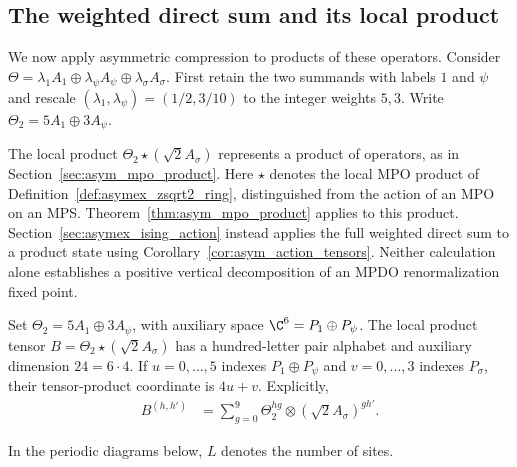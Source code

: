 \subsection{The weighted direct sum and its local product}%
\label{sec:asymex_ising_bond_object}

We now apply asymmetric compression to products of these operators.
Consider
$\Theta=\lambda_1A_1\oplus\lambda_\psi A_\psi\oplus\lambda_\sigma A_\sigma$.
First retain the two summands with labels $1$ and $\psi$ and rescale
$(\lambda_1,\lambda_\psi)=(1/2,3/10)$ to the integer weights $5,3$.
Write $\Theta_2=5A_1\oplus3A_\psi$.

The local product $\Theta_2\star(\sqrt2A_\sigma)$ represents a product
of operators, as in Section~\ref{sec:asym_mpo_product}. Here $\star$
denotes the local MPO product of
Definition~\ref{def:asymex_zsqrt2_ring}, distinguished from the action
of an MPO on an MPS. Theorem~\ref{thm:asym_mpo_product} applies to
this product. Section~\ref{sec:asymex_ising_action} instead applies the
full weighted direct sum to a product state using
Corollary~\ref{cor:asym_action_tensors}.
Neither calculation alone establishes a positive vertical decomposition
of an MPDO renormalization fixed point.

\begin{definition}%
    \label{def:asymex_ising_bond_object}
    \leanok
    Set $\Theta_2=5A_1\oplus3A_\psi$, with auxiliary space
    $\C^6=P_1\oplus P_\psi$. The local product tensor
    $B=\Theta_2\star(\sqrt2A_\sigma)$ has a hundred-letter pair alphabet
    and auxiliary dimension $24=6\cdot4$. If $u=0,\ldots,5$ indexes
    $P_1\oplus P_\psi$ and $v=0,\ldots,3$ indexes $P_\sigma$, their
    tensor-product coordinate is $4u+v$. Explicitly,
    \begin{align}
        B^{(h,h')} & =\sum_{g=0}^{9}
        \Theta_2^{hg}\otimes(\sqrt2A_\sigma)^{gh'}.
        \label{eq:asymex_ising_product_letters}
    \end{align}
\end{definition}

In the periodic diagrams below, $L$ denotes the number of sites.


